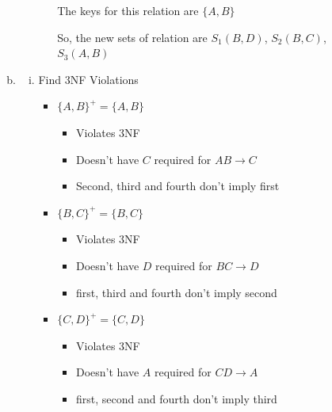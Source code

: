 \documentclass[12pt]{article}
\begin{document}
\begin{enumerate}[1.]
\begin{enumerate}[a)]
\begin{enumerate}[i)]
\begin{enumerate}[1.]
                \bigskip

                \color{red}
                The keys for this relation are $\{A,B\}$

                \bigskip

                So, the new sets of relation are $S_1(B,D)$, $S_2(B,C)$, $S_3(A,B)$
                \color{black}

                \bigskip

            \end{enumerate}
        \end{enumerate}

        \item

        \begin{enumerate}[i)]
            \item Find 3NF Violations

            \bigskip

            \color{red}
            \begin{itemize}
                \item $\{A,B\}^+ = \{A,B\}$
                \begin{itemize}
                    \item Violates 3NF
                    \item Doesn't have $C$ required for $AB \to C$
                    \item Second, third and fourth don't imply first
                \end{itemize}

                \item $\{B,C\}^+ = \{B,C\}$
                \begin{itemize}
                    \item Violates 3NF
                    \item Doesn't have $D$ required for $BC \to D$
                    \item first, third and fourth don't imply second
                \end{itemize}

                \item $\{C,D\}^+ = \{C,D\}$
                \begin{itemize}
                    \item Violates 3NF
                    \item Doesn't have $A$ required for $CD \to A$
                    \item first, second and fourth don't imply third
                \end{itemize}


\end{itemize}
\end{enumerate}
\end{enumerate}
\end{enumerate}
\end{document}
